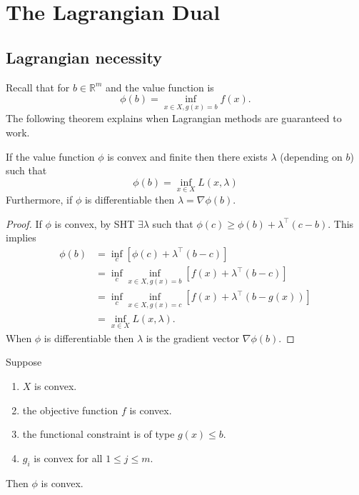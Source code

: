 \section{The Lagrangian Dual}
\subsection{Lagrangian necessity}
Recall that for $b \in \mathbb{R}^m$ and the value function is
\[
\phi(b)=\inf _{x \in X, g(x)=b} f(x) .
\]
The following theorem explains when Lagrangian methods are guaranteed to work. 
\begin{theorem}
    If the value function $\phi$ is convex and finite then there exists $\lambda$ (depending on $b$) such that
    \[
    \phi(b)=\inf _{x \in X} L(x, \lambda)
    \]
    Furthermore, if $\phi$ is differentiable then $\lambda=\nabla \phi(b)$.
\end{theorem}

\begin{proof}
    If $\phi$ is convex, by SHT $ \exists \lambda $ such that $ \phi(c) \ge \phi(b) + \lambda^\top(c-b) $. This implies 
    \begin{align*}
        \phi(b) &= \inf _c [\phi(c) + \lambda^\top(b-c)]\\ 
        &= \inf _c \inf_{x\in X, g(x)=b} [f(x)+ \lambda^\top (b-c)]\\ 
        &= \inf_{c}\inf_{x\in X, g(x)=c} [f(x) + \lambda^\top(b-g(x))]\\ 
        &= \inf _{x\in X} L(x,\lambda).
    \end{align*}
    When $\phi$ is differentiable then $\lambda$ is the gradient vector $\nabla \phi(b)$.
\end{proof}

\begin{theorem}
    Suppose
    \begin{enumerate}
        \item $X$ is convex.
        \item the objective function $f$ is convex.
        \item the functional constraint is of type $g(x) \leq b$.
        \item $g_i$ is convex for all $1 \leq j \leq m$.
    \end{enumerate}
    Then $\phi$ is convex.
\end{theorem}

